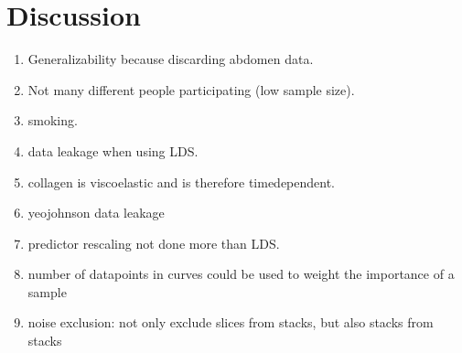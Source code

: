 \chapter{Discussion}

\begin{enumerate}
    \item Generalizability because discarding abdomen data.
    \item Not many different people participating (low sample size).
    \item smoking.
    \item data leakage when using LDS.
    \item collagen is viscoelastic and is therefore timedependent.
    \item yeojohnson data leakage
    \item predictor rescaling not done more than LDS.
    \item number of datapoints in curves could be used to weight the importance of a sample
    \item noise exclusion: not only exclude slices from stacks, but also stacks from stacks
\end{enumerate}